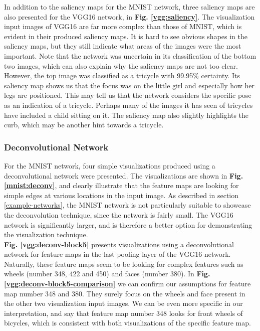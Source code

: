 \noindent In addition to the saliency maps for the MNIST network, three saliency maps are also presented for the VGG16 network, in \textbf{Fig. \ref{vgg:saliency}}. The visualization input images of VGG16 are far more complex than those of MNIST, which is evident in their produced saliency maps. It is hard to see obvious shapes in the saliency maps, but they still indicate what areas of the images were the most important. Note that the network was uncertain in its classification of the bottom two images, which can also explain why the saliency maps are not too clear. However, the top image was classified as a tricycle with 99.95\% certainty. Its saliency map shows us that the focus was on the little girl and especially how her legs are positioned. This may tell us that the network considers the specific pose as an indication of a tricycle. Perhaps many of the images it has seen of tricycles have included a child sitting on it. The saliency map also slightly highlights the curb, which may be another hint towards a tricycle.

\subsubsection{Deconvolutional Network}

For the MNIST network, four simple visualizations produced using a deconvolutional network were presented. The visualizations are shown in \textbf{Fig. \ref{mnist:deconv}}, and clearly illustrate that the feature maps are looking for simple edges at various locations in the input image. As described in section \ref{example-networks}, the MNIST network is not particularly suitable to showcase the deconvolution technique, since the network is fairly small. The VGG16 network is significantly larger, and is therefore a better option for demonstrating the visualization technique. \\

\noindent \textbf{Fig. \ref{vgg:deconv-block5}} presents visualizations using a deconvolutional network for feature maps in the last pooling layer of the VGG16 network. Naturally, these feature maps seem to be looking for complex features such as wheels (number 348, 422 and 450) and faces (number 380). In \textbf{Fig. \ref{vgg:deconv-block5-comparison}} we can confirm our assumptions for feature map number 348 and 380. They surely focus on the wheels and face present in the other two visualization input images. We can be even more specific in our interpretation, and say that feature map number 348 looks for front wheels of bicycles, which is consistent with both visualizations of the specific feature map. \\


